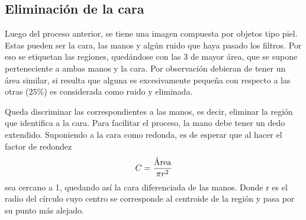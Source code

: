 \documentclass[portrait,a0paper,fontscale=0.277]{baposter}
\begin{document}
\begin{poster}
{		\subsection*{Eliminación de la cara}

			Luego del proceso anterior, se tiene una imagen compuesta por  objetos  tipo
			piel. Estas pueden ser la cara, las manos y algún ruido que haya pasado  los
			filtros. Por eso se etiquetan las  regiones, quedándose con las 3  de  mayor
			área, que se supone perteneciente a ambas manos y la cara.  Por  observación
			debieran de tener un área similar, si resulta que  alguna  es  excesivamente
			pequeña con respecto a  las  otras  ($25 \%$)  es  considerada  como  ruido  y
			eliminada.

			Queda discriminar las correspondientes a las manos, es decir, eliminar la
			región que identifica a la cara. Para facilitar el proceso, la mano debe
			tener un dedo extendido. Suponiendo a la cara como redonda, es de esperar
			que al hacer el factor de  redondez
			\[ C = \frac{\makebox{Área}}{\pi r^2}\]
			sea cercano a 1, quedando así la cara diferenciada de las manos. Donde r  es
			el radio del círculo cuyo centro se corresponde al centroide de la región  y
			pasa por su punto más alejado.

	}




\end{poster}
\end{document}
